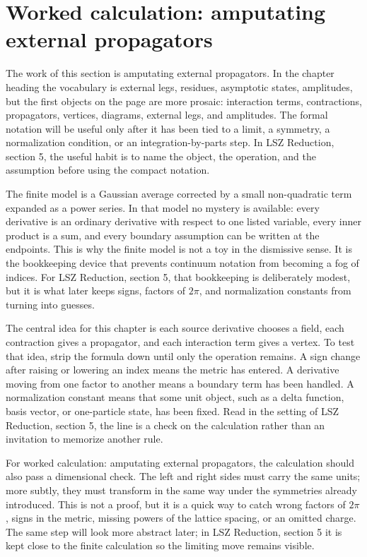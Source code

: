 \section{Worked calculation: amputating external propagators}

The work of this section is amputating external propagators.  In the chapter heading the vocabulary is external legs, residues, asymptotic states, amplitudes, but the first objects on the page are more prosaic: interaction terms, contractions, propagators, vertices, diagrams, external legs, and amplitudes.  The formal notation will be useful only after it has been tied to a limit, a symmetry, a normalization condition, or an integration-by-parts step.  In LSZ Reduction, section 5, the useful habit is to name the object, the operation, and the assumption before using the compact notation.

The finite model is a Gaussian average corrected by a small non-quadratic term expanded as a power series.  In that model no mystery is available: every derivative is an ordinary derivative with respect to one listed variable, every inner product is a sum, and every boundary assumption can be written at the endpoints.  This is why the finite model is not a toy in the dismissive sense.  It is the bookkeeping device that prevents continuum notation from becoming a fog of indices.  For LSZ Reduction, section 5, that bookkeeping is deliberately modest, but it is what later keeps signs, factors of \(2\pi\), and normalization constants from turning into guesses.

The central idea for this chapter is each source derivative chooses a field, each contraction gives a propagator, and each interaction term gives a vertex.  To test that idea, strip the formula down until only the operation remains.  A sign change after raising or lowering an index means the metric has entered.  A derivative moving from one factor to another means a boundary term has been handled.  A normalization constant means that some unit object, such as a delta function, basis vector, or one-particle state, has been fixed.  Read in the setting of LSZ Reduction, section 5, the line is a check on the calculation rather than an invitation to memorize another rule.

For worked calculation: amputating external propagators, the calculation should also pass a dimensional check.  The left and right sides must carry the same units; more subtly, they must transform in the same way under the symmetries already introduced.  This is not a proof, but it is a quick way to catch wrong factors of \(2\pi\), signs in the metric, missing powers of the lattice spacing, or an omitted charge.  The same step will look more abstract later; in LSZ Reduction, section 5 it is kept close to the finite calculation so the limiting move remains visible.

